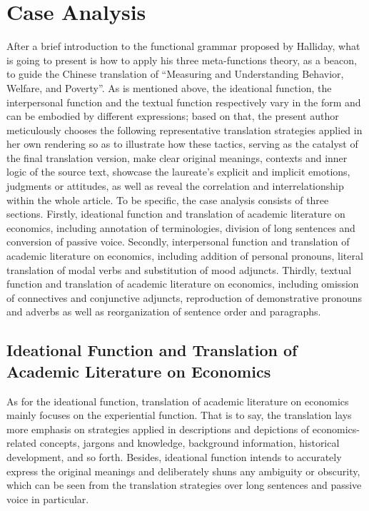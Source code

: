 \chapter{Case Analysis}
After a brief introduction to the functional grammar proposed by Halliday, what is going to present is how to apply his three meta-functions theory, as a beacon, to guide the Chinese translation of “Measuring and Understanding Behavior, Welfare, and Poverty”. As is mentioned above, the ideational function, the interpersonal function and the textual function respectively vary in the form and can be embodied by different expressions; based on that, the present author meticulously chooses the following representative translation strategies applied in her own rendering so as to illustrate how these tactics, serving as the catalyst of the final translation version, make clear original meanings, contexts and inner logic of the source text, showcase the laureate’s explicit and implicit emotions, judgments or attitudes, as well as reveal the correlation and interrelationship within the whole article.
To be specific, the case analysis consists of three sections. Firstly, ideational function and translation of academic literature on economics, including annotation of terminologies, division of long sentences and conversion of passive voice. Secondly, interpersonal function and translation of academic literature on economics, including addition of personal pronouns, literal translation of modal verbs and substitution of mood adjuncts. Thirdly, textual function and translation of academic literature on economics, including omission of connectives and conjunctive adjuncts, reproduction of demonstrative pronouns and adverbs as well as reorganization of sentence order and paragraphs. 
\section{Ideational Function and Translation of Academic Literature on Economics}
As for the ideational function, translation of academic literature on economics mainly focuses on the experiential function. That is to say, the translation lays more emphasis on strategies applied in descriptions and depictions of economics-related concepts, jargons and knowledge, background information, historical development, and so forth. Besides, ideational function intends to accurately express the original meanings and deliberately shuns any ambiguity or obscurity, which can be seen from the translation strategies over long sentences and passive voice in particular.
